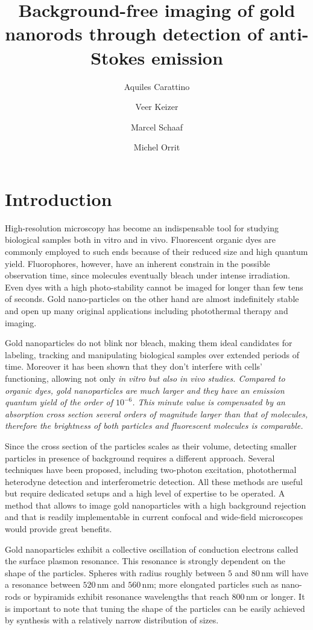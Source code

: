 \documentclass[journal=nalefd,manuscript=letter]{achemso}
\author{Aquiles Carattino}
\affiliation[Leiden]
{Huygens-Kamerlingh Onnes, Leiden, The Netherlands}
\author{Veer Keizer}
\affiliation[Leiden]
{Huygens-Kamerlingh Onnes, Leiden, The Netherlands}
\author{Marcel Schaaf}
\affiliation[Leiden]
{Huygens-Kamerlingh Onnes, Leiden, The Netherlands}
\author{Michel Orrit}
\affiliation[Leiden]
{Huygens-Kamerlingh Onnes Lab, 2300RA Leiden, The Netherlands}
\title{Background-free imaging of gold nanorods through detection of
anti-Stokes emission}
\newcommand{\nm}{\ensuremath{\,\textrm{nm}}}
\begin{document}
\maketitle
{}
\section{Introduction}
High-resolution microscopy has become an indispensable tool for studying
biological samples both in vitro and in vivo\cite{Moerner2007}.
Fluorescent organic dyes are commonly employed to such ends because of their
reduced size and high quantum yield. Fluorophores, however, have an inherent
constrain in the possible observation time, since molecules eventually bleach
under intense irradiation. Even dyes with a high photo-stability cannot be imaged for
longer than few tens of seconds. Gold nano-particles on the other hand are
almost indefinitely stable and open up many original applications including
photothermal therapy and imaging.

Gold nanoparticles do not blink nor bleach, making them ideal candidates for
labeling, tracking and manipulating biological samples over extended periods of
time. Moreover it has been shown that they don't interfere with cells'
functioning\cite{Lewinski2008}, allowing not only \em{in vitro} but also \em{in
vivo} studies. Compared to organic dyes, gold nanoparticles are much larger and
they have an emission quantum yield of the order of $10^{-6}$. This minute value
is compensated by an absorption cross section several orders of magnitude larger
than that of molecules, therefore the brightness of both particles and
fluorescent molecules is comparable.

Since the cross section of the particles scales as their volume, detecting
smaller particles in presence of background requires a different approach.
Several techniques have been proposed, including two-photon
excitation\cite{VandenBroek2013}, photothermal heterodyne
detection\cite{Berciaud2006} and interferometric detection\cite{Ignatovich2006}.
All these methods are useful but require dedicated setups and a high level of
expertise to be operated. A method that allows to image gold nanoparticles with
a high background rejection and that is readily implementable in current
confocal and wide-field microscopes would provide great benefits.

Gold nanoparticles exhibit a collective oscillation of conduction electrons
called the surface plasmon resonance. This resonance is strongly dependent on
the shape of the particles. Spheres with radius roughly between $5$ and $80\nm$
will have a resonance between $520\nm$ and $560\nm$; more elongated particles
such as nano-rods or bypiramids exhibit resonance wavelengths that reach
$800\nm$ or longer. It is important to note that tuning the shape of the particles can be
easily achieved by synthesis with a relatively narrow distribution of sizes.
\end{document}
